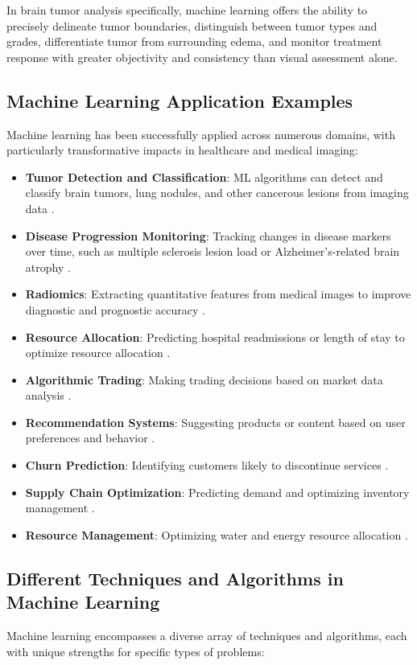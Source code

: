 In brain tumor analysis specifically, machine learning offers the ability to precisely delineate tumor boundaries, distinguish between tumor types and grades, differentiate tumor from surrounding edema, and monitor treatment response with greater objectivity and consistency than visual assessment alone.

\subsection{Machine Learning Application Examples}
\label{sec:ml_applications}
Machine learning has been successfully applied across numerous domains, with particularly transformative impacts in healthcare and medical imaging:

\begin{itemize}
  \item \textbf{Tumor Detection and Classification}: ML algorithms can detect and classify brain tumors, lung nodules, and other cancerous lesions from imaging data \cite{wang2019machine}.
  \item \textbf{Disease Progression Monitoring}: Tracking changes in disease markers over time, such as multiple sclerosis lesion load or Alzheimer's-related brain atrophy \cite{mortaheb2019machine}.
  \item \textbf{Radiomics}: Extracting quantitative features from medical images to improve diagnostic and prognostic accuracy \cite{lambin2012radiomics}.
  \item \textbf{Resource Allocation}: Predicting hospital readmissions or length of stay to optimize resource allocation \cite{futoma2015comparison}.
  \item \textbf{Algorithmic Trading}: Making trading decisions based on market data analysis \cite{treleaven2013algorithmic}.
  \item \textbf{Recommendation Systems}: Suggesting products or content based on user preferences and behavior \cite{ricci2011introduction}.
  \item \textbf{Churn Prediction}: Identifying customers likely to discontinue services \cite{verbeke2012building}.
  \item \textbf{Supply Chain Optimization}: Predicting demand and optimizing inventory management \cite{carbonneau2008application}.
  \item \textbf{Resource Management}: Optimizing water and energy resource allocation \cite{wu2014real}.
\end{itemize}

\subsection{Different Techniques and Algorithms in Machine Learning}
\label{sec:ml_techniques}
Machine learning encompasses a diverse array of techniques and algorithms, each with unique strengths for specific types of problems:

